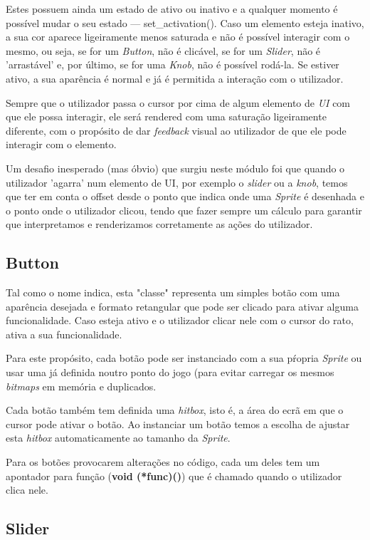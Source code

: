 \documentclass{report}
\begin{document}
Estes possuem ainda um estado de ativo ou inativo e a qualquer momento é possível mudar o seu estado --- set\_activation(). Caso um elemento esteja inativo, a sua cor aparece ligeiramente menos saturada e não é possível interagir com o mesmo, ou seja, se for um \textit{Button}, não é clicável, se for um \textit{Slider}, não é 'arrastável' e, por último, se for uma \textit{Knob}, não é possível rodá-la. Se estiver ativo, a sua aparência é normal e já é permitida a interação com o utilizador.

Sempre que o utilizador passa o cursor por cima de algum elemento de \textit{UI} com que ele possa interagir, ele será rendered com uma saturação ligeiramente diferente, com o propósito de dar \textit{feedback} visual ao utilizador de que ele pode interagir com o elemento.

Um desafio inesperado (mas óbvio) que surgiu neste módulo foi que quando o utilizador 'agarra' num elemento de UI, por exemplo o \textit{slider} ou a \textit{knob}, temos que ter em conta o offset desde o ponto que indica onde uma \textit{Sprite} é desenhada e o ponto onde o utilizador clicou, tendo que fazer sempre um cálculo para garantir que interpretamos e renderizamos corretamente as ações do utilizador.  

\subsection{Button}

Tal como o nome indica, esta "classe" representa um simples botão com uma aparência desejada e formato retangular que pode ser clicado para ativar alguma funcionalidade.
Caso esteja ativo e o utilizador clicar nele com o cursor do rato, ativa a sua funcionalidade.

Para este propósito, cada botão pode ser instanciado com a sua pŕopria \textit{Sprite} ou usar uma já definida noutro ponto do jogo (para evitar carregar os mesmos \textit{bitmaps} em memória e duplicados.

Cada botão também tem definida uma \textit{hitbox}, isto é, a área do ecrã em que o cursor pode ativar o botão. Ao instanciar um botão temos a escolha de ajustar esta \textit{hitbox} automaticamente ao tamanho da \textit{Sprite}.

Para os botões provocarem alterações no código, cada um deles tem um apontador para função (\textbf{void (*func)()}) que é chamado quando o utilizador clica nele.

\subsection{Slider}
\end{document}
